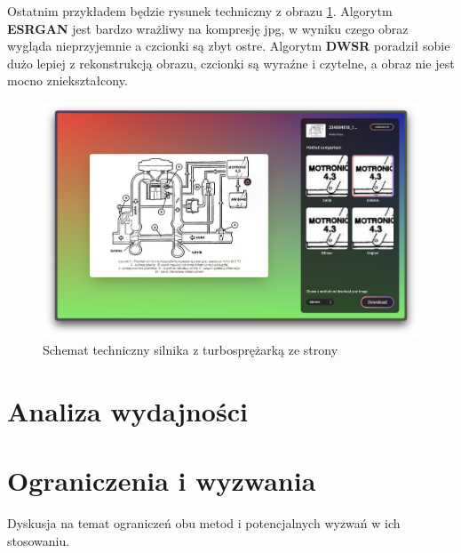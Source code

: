 Ostatnim przykładem będzie rysunek techniczny z obrazu \ref{fig:image105}. Algorytm \textbf{ESRGAN} jest bardzo wrażliwy na kompresję jpg, w wyniku czego obraz wygląda nieprzyjemnie a czcionki są zbyt ostre.  Algorytm \textbf{DWSR} poradził sobie dużo lepiej z rekonstrukcją obrazu, czcionki są wyraźne i czytelne, a obraz nie jest mocno zniekształcony.

\begin{figure}[H]
    \centering
    \includegraphics[width=0.85\linewidth]{Rozdziały/05.Porownanie_algorytmow/Obrazy/Zrzut ekranu 2023-12-12 o 14.20.22.jpg}  
    \caption{Schemat techniczny silnika z turbosprężarką ze strony \cite{zssplus} }
    \label{fig:image105}
\end{figure}

\section{Analiza wydajności}




\section{Ograniczenia i wyzwania}


Dyskusja na temat ograniczeń obu metod i potencjalnych wyzwań w ich stosowaniu.